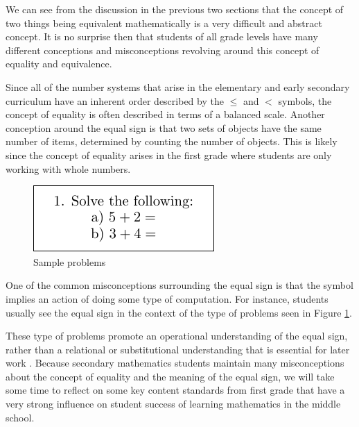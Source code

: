 \documentclass[
]{book}
\theoremstyle{definition}
\theoremstyle{definition}
\theoremstyle{definition}
\theoremstyle{remark}
\begin{document}
We can see from the discussion in the previous two sections that the concept of two things being equivalent mathematically is a very difficult and abstract concept. It is no surprise then that students of all grade levels have many different conceptions and misconceptions revolving around this concept of equality and equivalence.

Since all of the number systems that arise in the elementary and early secondary curriculum have an inherent order described by the \(\leq\) and \(<\) symbols, the concept of equality is often described in terms of a balanced scale. Another conception around the equal sign is that two sets of objects have the same number of items, determined by counting the number of objects. This is likely since the concept of equality arises in the first grade where students are only working with whole numbers.

\begin{figure}

{\centering \includegraphics[width=0.35\linewidth]{tikz/sample_addition_problem} 

}

\caption{Sample problems}\label{fig:equality-operation}
\end{figure}

One of the common misconceptions surrounding the equal sign is that the symbol implies an action of doing some type of computation. For instance, students usually see the equal sign in the context of the type of problems seen in Figure \ref{fig:equality-operation}.

These type of problems promote an operational understanding of the equal sign, rather than a relational or substitutional understanding that is essential for later work \citep[pp.~145-150]{Cognition}. Because secondary mathematics students maintain many misconceptions about the concept of equality and the meaning of the equal sign, we will take some time to reflect on some key content standards from first grade that have a very strong influence on student success of learning mathematics in the middle school.
\end{document}
